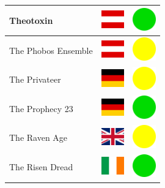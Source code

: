\documentclass[12pt, a4paper, twoside]{report}
\begin{document}
\begin{center}
\begin{longtable}{|p{5cm}|p{2cm}|p{2cm}|}
 Theotoxin                                                  & \includegraphics[width=1cm]{../img/flags/at} &   \includegraphics[width=1cm]{../likes/y} \\ \hline
 The Phobos Ensemble                                        & \includegraphics[width=1cm]{../img/flags/at} &   \includegraphics[width=1cm]{../likes/m} \\ \hline
 The Privateer                                              & \includegraphics[width=1cm]{../img/flags/de} &   \includegraphics[width=1cm]{../likes/m} \\ \hline
 The Prophecy 23                                            & \includegraphics[width=1cm]{../img/flags/de} &   \includegraphics[width=1cm]{../likes/y} \\ \hline
 The Raven Age                                              & \includegraphics[width=1cm]{../img/flags/gb} &   \includegraphics[width=1cm]{../likes/m} \\ \hline
 The Risen Dread                                            & \includegraphics[width=1cm]{../img/flags/ie} &   \includegraphics[width=1cm]{../likes/y} \\ \hline

\end{longtable}
\end{center}
\end{document}
